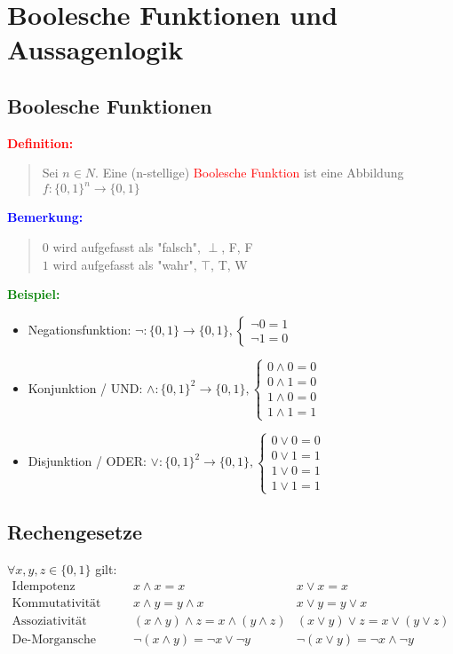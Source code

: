 \documentclass{article}
\newcommand{\red}[1]{\textcolor{red}{#1}}
\newcommand{\blue}[1]{\textcolor{blue}{#1}}
\newcommand{\green}[1]{\textcolor{green}{#1}}
\newcommand{\ex}{\green{\textbf{Beispiel: }}}
\newcommand{\de}[1]{\red{\textbf{Definition: }}\begin{quote}#1\end{quote}}
\newcommand{\an}[1]{\blue{\textbf{Bemerkung: }}\begin{quote}#1\end{quote}}
\begin{document}
\newpage
\section{Boolesche Funktionen und Aussagenlogik}

\subsection{Boolesche Funktionen}
\de{Sei $n \in N$. Eine (n-stellige) \red{Boolesche Funktion} ist eine Abbildung $f: \{0, 1\}^n \to \{0, 1\}$}
\an{
    $0$ wird aufgefasst als "falsch", $\perp$, F, F\\
    $1$ wird aufgefasst als "wahr", $\top$, T, W
}

\ex
\begin{itemize}
    \item Negationsfunktion: $\neg: \{0, 1\} \to \{0, 1\}, \begin{cases}
        \neg 0 = 1\\
        \neg 1 = 0
    \end{cases}$
    \item Konjunktion / UND: $\land: \{0, 1\}^2 \to \{0, 1\}, \begin{cases}
        0 \land 0 = 0\\
        0 \land 1 = 0\\
        1 \land 0 = 0\\
        1 \land 1 = 1
    \end{cases}$
    \item Disjunktion / ODER: $\lor: \{0, 1\}^2 \to \{0, 1\}, \begin{cases}
        0 \lor 0 = 0\\
        0 \lor 1 = 1\\
        1 \lor 0 = 1\\
        1 \lor 1 = 1
    \end{cases}$
\end{itemize}

\subsection{Rechengesetze}

$\forall x,y,z \in \{0, 1\}$ gilt:
\begin{equation*}
    \begin{array}{lcl}
        \text{Idempotenz} & x \land x = x & x \lor x = x\\
        \text{Kommutativität} & x \land y = y \land x & x \lor y = y \lor x\\
        \text{Assoziativität} & (x \land y) \land z = x \land (y \land z) & (x \lor y) \lor z = x \lor (y \lor z)\\
        \text{De-Morgansche Gesetze} & \neg(x \land y) = \neg x \lor \neg y & \neg(x \lor y) = \neg x \land \neg y\\
    \end{array}
\end{equation*}
\end{document}
